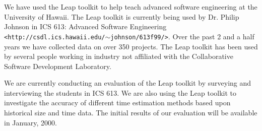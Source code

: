 We have used the Leap toolkit to help teach advanced software engineering at
the University of Hawaii.  The Leap toolkit is currently being used by Dr.
Philip Johnson in ICS 613: Advanced Software Engineering {\footnotesize {\tt
    <http://csdl.ics.hawaii.edu/$\sim$johnson/613f99/>}}.  Over the past 2 and
a half years we have collected data on over 350 projects.  The Leap toolkit has
been used by several people working in industry not affiliated with the
Collaborative Software Development Laboratory.

We are currently conducting an evaluation of the Leap toolkit by surveying and
interviewing the students in ICS 613.  We are also using the Leap toolkit to
investigate the accuracy of different time estimation methods based upon
historical size and time data.  The initial results of our evaluation will be
available in January, 2000.



%

\onecolumn



